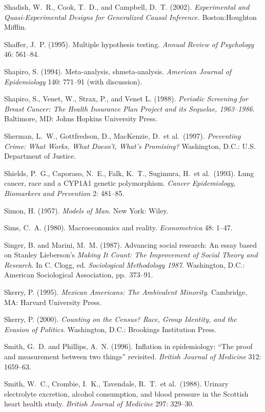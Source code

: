 \smallskip\noindent
Shadish, W.~R., Cook, T.~D., and Campbell, D.~T. (2002).
{\it Experimental and Quasi-Experimental Designs for Generalized Causal Inference.\/}
Boston:\break Houghton Mifflin.

\smallskip\noindent
Shaffer, J.~P. (1995).
Multiple hypothesis testing.
{\it Annual Review of Psychology\/} 46: 561--84.

\smallskip\noindent
Shapiro, S. (1994).
Meta-analysis, shmeta-analysis.
{\it American Journal of Epidemiology\/} 140: 771--91 (with discussion).

\smallskip\noindent
Shapiro, S., Venet, W., Strax, P., and Venet L. (1988).
{\it Periodic Screening for Breast Cancer: The Health Insurance Plan Project and its Sequelae, 1963--1986\/}.
Baltimore, MD: Johns Hopkins University Press.

\smallskip\noindent
Sherman, L.~W., Gottfredson, D., MacKenzie, D.~et al.~(1997).
{\it Preventing Crime: What Works, What Doesn't, What's Promising?}
Washington, D.C.: U.S. Department of Justice.

\smallskip\noindent
Shields, P.~G., Caporaso, N.~E., Falk, K.~T., Sugimura, H.~et al.~(1993).
Lung cancer, race and a CYP1A1 genetic polymorphism.
{\it Cancer Epidemiology, Biomarkers and Prevention\/} 2: 481--85.

\smallskip\noindent
Simon, H. (1957).
{\it Models of Man\/}.
New York: Wiley.

\smallskip\noindent
Sims, C.~A. (1980).
Macroeconomics and reality.
{\it Econometrica\/} 48: 1--47.

\smallskip\noindent
Singer, B. and Marini, M.~M. (1987).
Advancing social research: An essay based on Stanley Lieberson's
{\it Making It Count: The Improvement of Social Theory and Research\/}.
In C. Clogg, ed. {\it Sociological Methodology 1987\/}.
Washington, D.C.: American Sociological Association, pp.~373--91.

\smallskip\noindent
Skerry, P. (1995).
{\it Mexican Americans: The Ambivalent Minority}.
Cambridge, MA: Harvard University Press.

\smallskip\noindent
Skerry, P. (2000).
{\it Counting on the Census? Race, Group Identity, and the Evasion of Politics\/}.
Washington, D.C.: Brookings Institution Press.

\smallskip\noindent
Smith, G.~D. and Phillips, A.~N. (1996).
Inflation in epidemiology: ``The proof and measurement between two things'' revisited.
{\it British Journal of Medicine\/} 312: 1659--63.

\smallskip\noindent
Smith, W.~C., Crombie, I.~K., Tavendale, R.~T.~et al.~(1988).
Urinary electrolyte excretion, alcohol consumption, and blood pressure in the Scottish heart health study.
{\it British Journal of Medicine\/} 297: 329--30.

